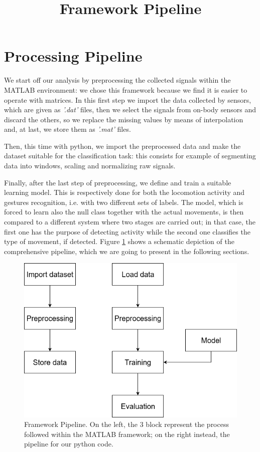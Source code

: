 
\section{Processing Pipeline}
\label{sec:processing_architecture}

We start off our analysis by preprocessing the collected signals within the MATLAB environment: we chose this framework because we find it is easier to operate with matrices. In this first step we import the data collected by sensors, which are given as \textit{'.dat'} files, then we select the signals from on-body sensors and discard the others, so we replace the missing values by means of interpolation and, at last, we store them as \textit{'.mat'} files.

Then, this time with python, we import the preprocessed data and make the dataset suitable for the classification task: this consists for example of segmenting data into windows, scaling and normalizing raw signals.

Finally, after the last step of preprocessing, we define and train a suitable learning model. This is respectively done for both the locomotion activity and gestures recognition, i.e. with two different sets of labels. The model, which is forced to learn also the null class together with the actual movements, is then compared to a different system where two stages are carried out; in that case, the first one has the purpose of detecting activity while the second one classifies the type of movement, if detected. Figure \ref{fig:pipeline} shows a schematic depiction of the comprehensive pipeline, which we are going to present in the following sections.

\begin{figure}[t]
	\centering
	\includegraphics[scale=.4]{figure/block_diag}
	\title{Framework Pipeline}
	\caption{Framework Pipeline. On the left, the 3 block represent the process followed within the MATLAB framework; on the right instead, the pipeline for our python code.}
	\label{fig:pipeline}
\end{figure}

